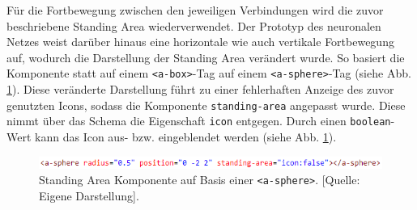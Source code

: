 \documentclass[a4paper,12pt,oneside]{article}
\begin{document}
        Für die Fortbewegung zwischen den jeweiligen Verbindungen wird die
        zuvor beschriebene Standing Area wiederverwendet. Der Prototyp des
        neuronalen Netzes weist darüber hinaus eine horizontale wie auch 
        vertikale Fortbewegung auf, wodurch die Darstellung der 
        Standing Area verändert wurde. 
        So basiert die Komponente statt auf einem
        \texttt{<a-box>}-Tag auf einem \texttt{<a-sphere>}-Tag 
        (siehe Abb. \ref{fig:neural-network2}). Diese veränderte
        Darstellung führt zu einer fehlerhaften Anzeige des zuvor genutzten
        Icons, sodass die Komponente \texttt{standing-area} angepasst wurde.
        Diese nimmt über das Schema die Eigenschaft \texttt{icon} entgegen.
        Durch einen \texttt{boolean}-Wert kann das Icon aus- bzw. eingeblendet
        werden (siehe Abb. \ref{fig:neural-network2}).
        \begin{figure}
          \centering
          \includegraphics{img/coding/neural-network2.png}
          \caption[Standing Area Komponente auf Basis einer \texttt{<a-sphere>}.]{Standing Area Komponente auf Basis einer \texttt{<a-sphere>}. [Quelle: Eigene Darstellung].}
          \label{fig:neural-network2}
        \end{figure}
\end{document}
